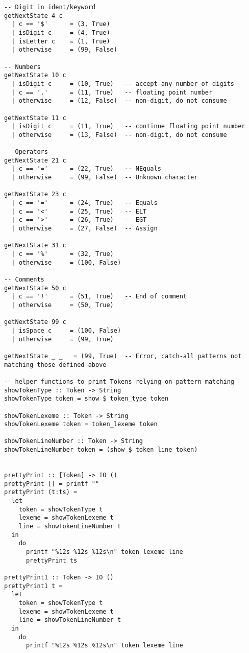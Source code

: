 \documentclass[11pt]{article}
\begin{document}
\begin{verbatim}
-- Digit in ident/keyword
getNextState 4 c
  | c == '$'      = (3, True)
  | isDigit c     = (4, True)
  | isLetter c    = (1, True)
  | otherwise     = (99, False)

-- Numbers
getNextState 10 c
  | isDigit c     = (10, True)   -- accept any number of digits
  | c == '.'      = (11, True)   -- floating point number
  | otherwise     = (12, False)  -- non-digit, do not consume

getNextState 11 c
  | isDigit c     = (11, True)   -- continue floating point number
  | otherwise     = (13, False)  -- non-digit, do not consume

-- Operators
getNextState 21 c
  | c == '='      = (22, True)   -- NEquals
  | otherwise     = (99, False)  -- Unknown character

getNextState 23 c
  | c == '='      = (24, True)   -- Equals
  | c == '<'      = (25, True)   -- ELT
  | c == '>'      = (26, True)   -- EGT
  | otherwise     = (27, False)  -- Assign

getNextState 31 c
  | c == '%'      = (32, True)
  | otherwise     = (100, False)

-- Comments
getNextState 50 c
  | c == '!'      = (51, True)   -- End of comment
  | otherwise     = (50, True)

getNextState 99 c
  | isSpace c     = (100, False)
  | otherwise     = (99, True)

getNextState _ _   = (99, True)  -- Error, catch-all patterns not matching those defined above

-- helper functions to print Tokens relying on pattern matching
showTokenType :: Token -> String
showTokenType token = show $ token_type token

showTokenLexeme :: Token -> String
showTokenLexeme token = token_lexeme token

showTokenLineNumber :: Token -> String
showTokenLineNumber token = (show $ token_line token)


prettyPrint :: [Token] -> IO ()
prettyPrint [] = printf ""
prettyPrint (t:ts) =
  let
    token = showTokenType t
    lexeme = showTokenLexeme t
    line = showTokenLineNumber t
  in
    do
      printf "%12s %12s %12s\n" token lexeme line
      prettyPrint ts

prettyPrint1 :: Token -> IO ()
prettyPrint1 t =
  let
    token = showTokenType t
    lexeme = showTokenLexeme t
    line = showTokenLineNumber t
  in
    do
      printf "%12s %12s %12s\n" token lexeme line
\end{verbatim}
\end{document}
